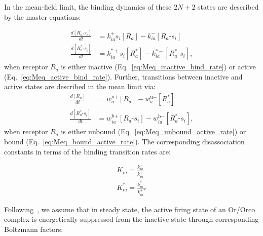 In the mean-field limit, the binding dynamics of these $2N + 2$ states are described by the master equations:

\begin{align}
\frac{d[R_a\text{-}s_i]}{dt} &= k^+_{ia}s_i[R_a] - k^-_{ia}[R_a\text{-}s_i] \label{eq:Meq_inactive_bind_rate}\\
\frac{d[R^*_a\text{-}s_i]}{dt} &= k^{*+}_{ia}s_i[R^*_a] - k^{*-}_{ia}[R^*_a\text{-}s_i],
\label{eq:Meq_active_bind_rate}
\end{align}
when receptor $R_a$ is either inactive (Eq.~\ref{eq:Meq_inactive_bind_rate}) or active (Eq.~\ref{eq:Meq_active_bind_rate}). Further, transitions between inactive and active states are described in the mean limit via:
\begin{align}
\frac{d[R_a]}{dt} &= w^{\text{u}+}_a [R_a] - w^{\text{u}-}_a [R^*_a] \label{eq:Meq_unbound_active_rate}\\
\frac{d[R^*_a\text{-}s_i]}{dt} &=  w^{\text{b}+}_{ia} [R_a\text{-}s_i] - w^{\text{b}-}_{ia}  [R^*_a\text{-}s_i],
\label{eq:Meq_bound_active_rate}
\end{align}
when receptor $R_a$ is either unbound (Eq.~\ref{eq:Meq_unbound_active_rate}) or bound (Eq.~\ref{eq:Meq_bound_active_rate}). The corresponding disassociation constants in terms of the binding transition rates are:


\begin{align}
K_{ia} = \frac{k^-_{ia}}{k^+_{ia}} \nonumber \\
K^*_{ia} = \frac{k^{*-}_{ia}}{k^{+*}_{ia}} 
\label{eq:Kd}
\end{align}

Following~\cite{srinivas_elife}, we assume that in steady state, the active firing state of an Or/Orco complex is energetically suppressed from the inactive state through corresponding Boltzmann factors:

